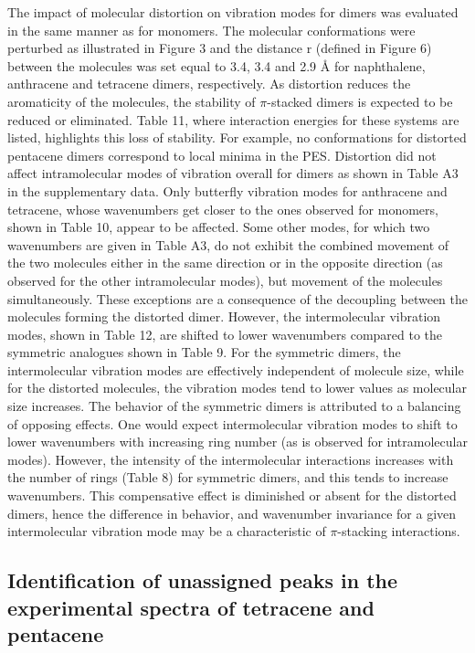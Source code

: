 The impact of molecular distortion on vibration modes for dimers was evaluated in the same manner as for monomers. The molecular conformations were perturbed as illustrated in Figure 3 and the distance r (defined in Figure 6) between the molecules was set equal to 3.4, 3.4 and 2.9 Å for naphthalene, anthracene and tetracene dimers, respectively.  As distortion reduces the aromaticity of the molecules, the stability of $\pi$-stacked dimers is expected to be reduced or eliminated. Table 11, where interaction energies for these systems are listed, highlights this loss of stability. For example, no conformations for distorted pentacene dimers correspond to local minima in the PES. Distortion did not affect intramolecular modes of vibration overall for dimers as shown in Table A3 in the supplementary data. Only butterfly vibration modes for anthracene and tetracene, whose wavenumbers get closer to the ones observed for monomers, shown in Table 10, appear to be affected. Some other modes, for which two wavenumbers are given in Table A3, do not exhibit the combined movement of the two molecules either in the same direction or in the opposite direction (as observed for the other intramolecular modes), but movement of the molecules simultaneously. These exceptions are a consequence of the decoupling between the molecules forming the distorted dimer. However, the intermolecular vibration modes, shown in Table 12, are shifted to lower wavenumbers compared to the symmetric analogues shown in Table 9. For the symmetric dimers, the intermolecular vibration modes are effectively independent of molecule size, while for the distorted molecules, the vibration modes tend to lower values as molecular size increases. 
The behavior of the symmetric dimers is attributed to a balancing of opposing effects. One would expect intermolecular vibration modes to shift to lower wavenumbers with increasing ring number (as is observed for intramolecular modes). However, the intensity of the intermolecular interactions increases with the number of rings (Table 8) for symmetric dimers, and this tends to increase wavenumbers. This compensative effect is diminished or absent for the distorted dimers, hence the difference in behavior, and wavenumber invariance for a given intermolecular vibration mode may be a characteristic of $\pi$-stacking interactions. 

\singlespacing
\subsection{Identification of unassigned peaks in the experimental spectra of tetracene and pentacene}

